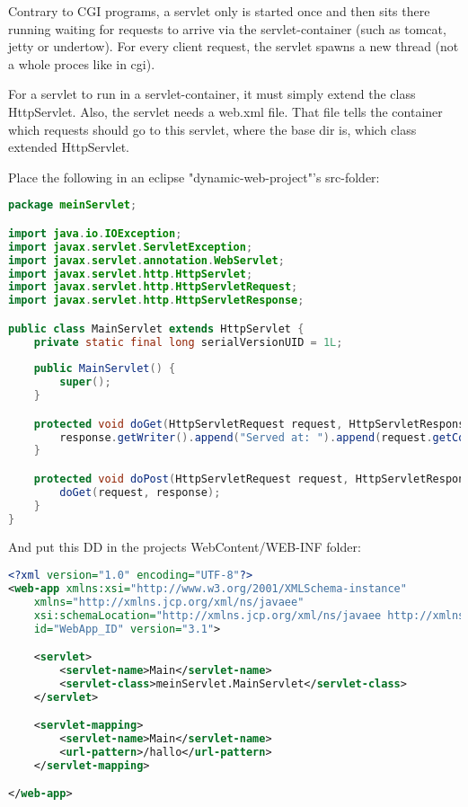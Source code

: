 Contrary to CGI programs, a servlet only is started once and then sits there running waiting for requests to arrive via the servlet-container (such as tomcat, jetty or undertow). For every client request, the servlet spawns a new thread (not a whole proces like in cgi).

For a servlet to run in a servlet-container, it must simply extend the class HttpServlet. Also, the servlet needs a web.xml file. That file tells the container which requests should go to this servlet, where the base dir is, which class extended HttpServlet.


Place the following in an eclipse "dynamic-web-project"'s src-folder:

\begin{lstlisting}[language=java]
package meinServlet;

import java.io.IOException;
import javax.servlet.ServletException;
import javax.servlet.annotation.WebServlet;
import javax.servlet.http.HttpServlet;
import javax.servlet.http.HttpServletRequest;
import javax.servlet.http.HttpServletResponse;

public class MainServlet extends HttpServlet {
	private static final long serialVersionUID = 1L;
       
    public MainServlet() {
        super();
    }

	protected void doGet(HttpServletRequest request, HttpServletResponse response) throws ServletException, IOException {
		response.getWriter().append("Served at: ").append(request.getContextPath());
	}

	protected void doPost(HttpServletRequest request, HttpServletResponse response) throws ServletException, IOException {
		doGet(request, response);
	}
}
\end{lstlisting}

And put this DD in the projects WebContent/WEB-INF folder: 

\begin{lstlisting}[language=xml]
<?xml version="1.0" encoding="UTF-8"?>
<web-app xmlns:xsi="http://www.w3.org/2001/XMLSchema-instance"
	xmlns="http://xmlns.jcp.org/xml/ns/javaee"
	xsi:schemaLocation="http://xmlns.jcp.org/xml/ns/javaee http://xmlns.jcp.org/xml/ns/javaee/web-app_3_1.xsd"
	id="WebApp_ID" version="3.1">

	<servlet>
		<servlet-name>Main</servlet-name>
		<servlet-class>meinServlet.MainServlet</servlet-class>
	</servlet>

	<servlet-mapping>
		<servlet-name>Main</servlet-name>
		<url-pattern>/hallo</url-pattern>
	</servlet-mapping>

</web-app>
\end{lstlisting}

